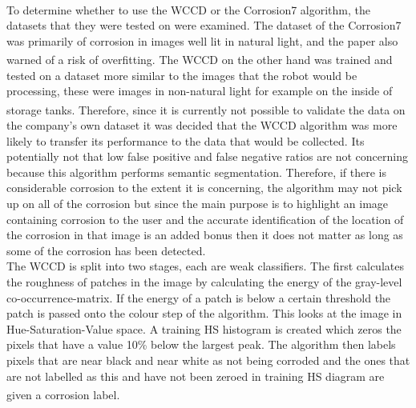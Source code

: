 \documentclass[11pt]{article}		%
\newcommand{\supercite}[1]{\textsuperscript{\cite{#1}}}		%
\begin{document}
	        \\
	        To determine whether to use the WCCD or the Corrosion7 algorithm, the datasets that they were tested on were examined. 
	        The dataset of the Corrosion7 was primarily of corrosion in images well lit in natural light, and the paper also warned of a risk of overfitting.\supercite{Corrosion7} 
	        The WCCD on the other hand was trained and tested on a dataset more similar to the images that the robot would be processing, these were images in non-natural light for example on the inside of storage tanks.\supercite{WCCD} 
	        Therefore, since it is currently not possible to validate the data on the company's own dataset it was decided that the WCCD algorithm was more likely to transfer its performance to the data that would be collected. 
	        Its potentially not that low false positive and false negative ratios are not concerning because this algorithm performs semantic segmentation. 
	        Therefore, if there is considerable corrosion to the extent it is concerning, the algorithm may not pick up on all of the corrosion but since the main purpose is to highlight an image containing corrosion to the user and the accurate identification of the location of the corrosion in that image is an added bonus then it does not matter as long as some of the corrosion has been detected.
	        \\
		    The WCCD is split into two stages, each are weak classifiers. The first calculates the roughness of patches in the image by calculating the energy of the gray-level co-occurrence-matrix. If the energy of a patch is below a certain threshold the patch is passed onto the colour step of the algorithm. This looks at the image in Hue-Saturation-Value space. A training HS histogram is created which zeros the pixels that have a value 10\% below the largest peak. The algorithm then labels pixels that are near black and near white as not being corroded and the ones that are not labelled as this and have not been zeroed in training HS diagram are given a corrosion label.\supercite{WCCD}  
		    \\
\end{document}
